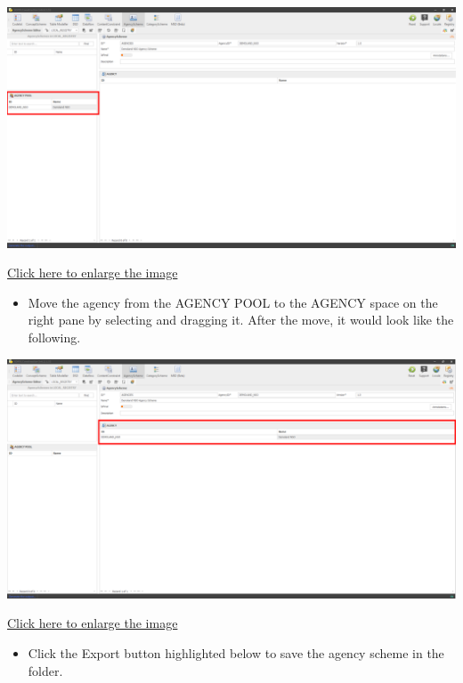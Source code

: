 \documentclass[
]{book}
\providecommand{\tightlist}{%
  \setlength{\itemsep}{0pt}\setlength{\parskip}{0pt}}
\begin{document}
\begin{center}\includegraphics[width=1\linewidth]{./images/image068} \end{center}

\href{images/image068.png}{Click here to enlarge the image}

\begin{itemize}
\tightlist
\item
  Move the agency from the AGENCY POOL to the AGENCY space on the right pane by selecting and dragging it. After the move, it would look like the following.
\end{itemize}

\begin{center}\includegraphics[width=1\linewidth]{./images/image070} \end{center}

\href{images/image070.png}{Click here to enlarge the image}

\begin{itemize}
\tightlist
\item
  Click the Export button highlighted below to save the agency scheme in the folder.
\end{itemize}
\end{document}
